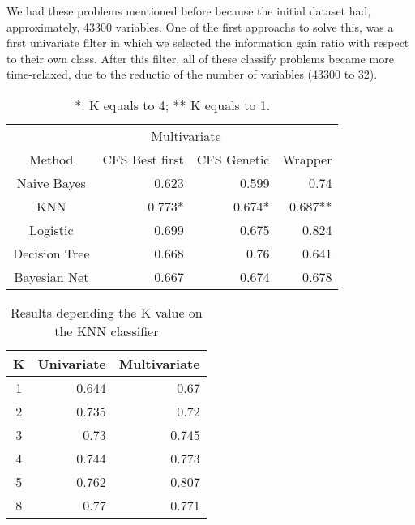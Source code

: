 \documentclass[conference,a4paper]{IEEEtran}
\begin{document}
We had these problems mentioned before because the initial dataset had, approximately, 43300 variables. One of the first approachs to solve this, was a first univariate filter in which we selected the information gain ratio with respect to their own class. After this filter, all of these classify problems became more time-relaxed, due to the reductio of the number of variables (43300 to 32).

\begin{table}[h]
	\caption{*: K equals to 4; ** K equals to 1.}
	\centering
	\begin{tabular}{c r r r}
		\hline\hline
		& \multicolumn{2}{c}{Multivariate} & \\
		Method & CFS Best first & CFS Genetic & Wrapper\\ [0.2ex]
		\hline
		Naive Bayes & 0.623 & 0.599 & 0.74 \\
		KNN & 0.773* & 0.674* & 0.687** \\
		Logistic & 0.699 & 0.675 & 0.824 \\
		Decision Tree & 0.668 & 0.76 & 0.641 \\
		Bayesian Net & 0.667 & 0.674 & 0.678 \\ [1ex]
		\hline
	\end{tabular}
	\label{table:filteredResults}
\end{table}

\begin{table}[h]
	\caption{Results depending the K value on the KNN classifier}
	\centering
	\begin{tabular}{c r r}
		\hline\hline
		K & Univariate & Multivariate\\ [0.2ex]
		\hline
		1 & 0.644 & 0.67\\
		2 & 0.735 & 0.72\\
		3 & 0.73 & 0.745\\
		4 & 0.744 & 0.773\\
		5 & 0.762 & 0.807\\
		8 & 0.77 & 0.771 \\ [1ex]
		\hline
	\end{tabular}
	\label{table:knnResults}
\end{table}
\end{document}
